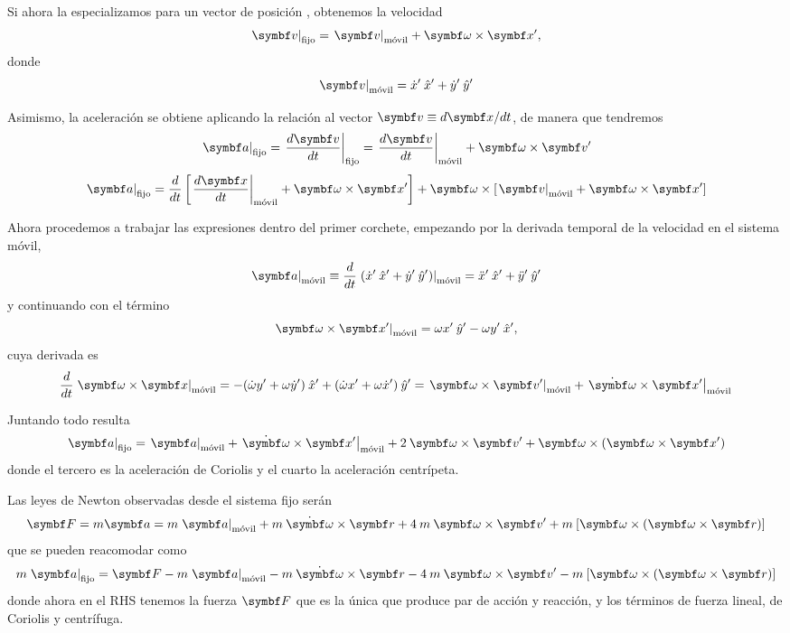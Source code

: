 \documentclass[10pt,oneside]{CBFT_book}
\begin{document}
Si ahora la especializamos para un vector de posición , obtenemos la velocidad  
\[
	\left. \vb{v} \right|_\text{fijo} = \left. \vb{v} \right|_\text{móvil} + \vb{\omega} \times \vb{x}',
\]
donde 
\[
	\left. \vb{v} \right|_\text{móvil} = \dot{x}' \xver' + \dot{y}' \yver' 
\]

Asimismo, la aceleración se obtiene aplicando la relación al vector $\vb{v} \equiv d\vb{x}/dt$, de manera que 
tendremos
\[
	\left. \vb{a} \right|_\text{fijo} = \left. \dtot{\vb{v}}{t} \right|_\text{fijo} = \left. \dtot{\vb{v}}{t} \right|_\text{móvil} +
	\vb{\omega} \times \vb{v}'
\]
\[
	\left. \vb{a} \right|_\text{fijo} = 
	\dtot{}{t}\left[ \left. \dtot{\vb{x}}{t} \right|_\text{móvil} + \vb{\omega}\times\vb{x}' \right] +
	\vb{\omega} \times \left[ \left. \vb{v} \right|_\text{móvil} +	\vb{\omega}\times\vb{x}' \right]
\]

Ahora procedemos a trabajar las expresiones dentro del primer corchete, empezando por la derivada temporal de la velocidad
en el sistema móvil,
\[
	\left. \vb{a} \right|_\text{móvil} \equiv  
	\dtot{}{t}\left.( \dot{x}' \xver' + \dot{y}' \yver' )\right|_\text{móvil} = \ddot{x}' \xver' + \ddot{y}' \yver'
\]
y continuando con el término 
\[
	\left.\vb{\omega}\times\vb{x}'\right|_\text{móvil} = \omega x' \yver' - \omega y' \xver' ,
\]
cuya derivada es
\[
	\dtot{}{t}\left.\vb{\omega}\times\vb{x}\right|_\text{móvil} = 
	-( \dot{\omega} y' + \omega \dot{y}' )\xver' + ( \dot{\omega} x' + \omega \dot{x}' )\yver' =
	\left. \vb{\omega} \times\vb{v}'\right|_\text{móvil} + \left.\dot{\vb{\omega}} \times\vb{x}'\right|_\text{móvil}
\]

Juntando todo resulta
\[
	\left. \vb{a}\right|_\text{fijo} = \left. \vb{a}\right|_\text{móvil} 
	+ \left.\dot{\vb{\omega}} \times\vb{x}'\right|_\text{móvil} + 2 \:\vb{\omega}\times\vb{v'} + \vb{\omega}
	\times (\vb{\omega} \times \vb{x}')
\]
donde el tercero es la aceleración de Coriolis y el cuarto la aceleración centrípeta.

Las leyes de Newton observadas desde el sistema fijo serán 
\[
	\vb{F} = m\vb{a} = m \left. \vb{a}\right|_\text{móvil} + m \: \dot{ \vb{\omega} } \times \vb{r} + 4 \: m \: 
	\vb{\omega}\times\vb{v'} + m \: [  \vb{\omega} \times (\vb{\omega}\times\vb{r} )]
\]
que se pueden reacomodar como  
\[
	m \left. \vb{a}\right|_\text{fijo} = 
	\vb{F} - m \left. \vb{a}\right|_\text{móvil} - m \: \dot{\vb{\omega}} \times \vb{r} - 4 \: m \: \vb{\omega}\times\vb{v'} -
	m \: [\vb{\omega} \times(\vb{\omega}\times\vb{r})]
\]
donde ahora en el RHS tenemos la fuerza $\vb{F}$ que es la única que produce par de acción y reacción, y los términos de 
fuerza lineal, de Coriolis y centrífuga.
\end{document}

